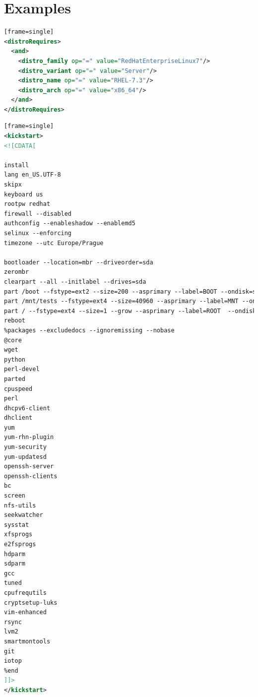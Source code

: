\documentclass[
  color, %
  table, %
  lof,   %
  lot,   %
]{fithesis3}
\begin{document}
\chapter{Examples}
\label{examples}


\begin{lstlisting}[language=xml, caption={Specifying OS to be installed in Beaker environment}, label={ex:os}][frame=single]
<distroRequires>
  <and>
    <distro_family op="=" value="RedHatEnterpriseLinux7"/>
    <distro_variant op="=" value="Server"/>
    <distro_name op="=" value="RHEL-7.3"/>
    <distro_arch op="=" value="x86_64"/>
  </and>
</distroRequires>
\end{lstlisting}


\begin{lstlisting}[language=xml, caption={Configuring environment and installing packages using kickstart}, label={ex:kickstart}][frame=single]
<kickstart>
<![CDATA[

install
lang en_US.UTF-8
skipx
keyboard us
rootpw redhat 
firewall --disabled
authconfig --enableshadow --enablemd5
selinux --enforcing
timezone --utc Europe/Prague

bootloader --location=mbr --driveorder=sda
zerombr
clearpart --all --initlabel --drives=sda
part /boot --fstype=ext2 --size=200 --asprimary --label=BOOT --ondisk=sda
part /mnt/tests --fstype=ext4 --size=40960 --asprimary --label=MNT --ondisk=sda
part / --fstype=ext4 --size=1 --grow --asprimary --label=ROOT  --ondisk=sda
reboot
%packages --excludedocs --ignoremissing --nobase
@core
wget
python
perl-devel
parted
cpuspeed
perl
dhcpv6-client
dhclient
yum
yum-rhn-plugin
yum-security
yum-updatesd
openssh-server
openssh-clients
bc
screen
nfs-utils
seekwatcher
sysstat
xfsprogs
e2fsprogs
hdparm
sdparm
gcc
tuned
cpufrequtils
cryptsetup-luks
vim-enhanced
rsync
lvm2
smartmontools
git
iotop
%end			
]]>
</kickstart>
\end{lstlisting}
\end{document}

